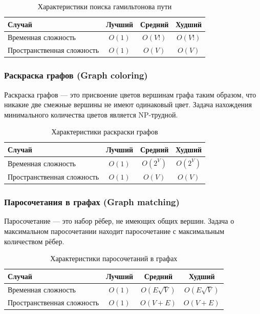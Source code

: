 \documentclass[a4paper,12pt]{article}
\begin{document}
\begin{table}[H]
    \centering
    \begin{tabular}{|l|c|c|c|}
        \hline
        Случай & Лучший & Средний & Худший \\
        \hline
        Временная сложность & $O(1)$ & $O(V!)$ & $O(V!)$ \\
        \hline
        Пространственная сложность & $O(1)$ & $O(V)$ & $O(V)$ \\
        \hline
    \end{tabular}
    \caption{Характеристики поиска гамильтонова пути}
\end{table}

\subsubsection{Раскраска графов (Graph coloring)}
\label{subsubsec:раскраска-графов-graph-coloring}

Раскраска графов --- это присвоение цветов вершинам графа таким образом, что никакие две смежные вершины не имеют одинаковый цвет. Задача нахождения минимального количества цветов является NP-трудной.

\begin{table}[H]
    \centering
    \begin{tabular}{|l|c|c|c|}
        \hline
        Случай & Лучший & Средний & Худший \\
        \hline
        Временная сложность & $O(1)$ & $O(2^V)$ & $O(2^V)$ \\
        \hline
        Пространственная сложность & $O(1)$ & $O(V)$ & $O(V)$ \\
        \hline
    \end{tabular}
    \caption{Характеристики раскраски графов}
\end{table}

\subsubsection{Паросочетания в графах (Graph matching)}
\label{subsubsec:паросочетания-в-графах-graph-matching}

Паросочетание --- это набор рёбер, не имеющих общих вершин. Задача о максимальном паросочетании находит паросочетание с максимальным количеством рёбер.

\begin{table}[H]
    \centering
    \begin{tabular}{|l|c|c|c|}
        \hline
        Случай & Лучший & Средний & Худший \\
        \hline
        Временная сложность & $O(1)$ & $O(E \sqrt{V})$ & $O(E \sqrt{V})$ \\
        \hline
        Пространственная сложность & $O(1)$ & $O(V + E)$ & $O(V + E)$ \\
        \hline
    \end{tabular}
    \caption{Характеристики паросочетаний в графах}
\end{table}
\end{document}
